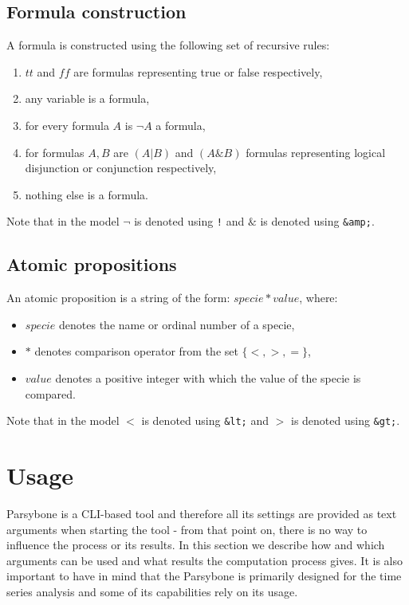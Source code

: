 \documentclass[12pt]{article}
\begin{document}
\subsection{Formula construction}
\label{FormulaConstruction}
A formula is constructed using the following set of recursive rules:
\begin{enumerate}
\item $tt$ and $ff$ are formulas representing true or false respectively,
\item any variable is a formula,
\item for every formula $A$ is $\neg A$ a formula,
\item for formulas $A,B$ are $(A|B)$ and $(A\&B)$ formulas representing logical disjunction or conjunction respectively,
\item nothing else is a formula.
\end{enumerate}
Note that in the model $\neg$ is denoted using \texttt{!} and $\&$ is denoted using \texttt{\&amp;}.

\subsection{Atomic propositions}
\label{AtomicPropositions}
An atomic proposition is a string of the form: $specie*value$, where:
\begin{itemize}
\item $specie$ denotes the name or ordinal number of a specie,
\item $*$ denotes comparison operator from the set $\{<,>,=\}$,
\item $value$ denotes a positive integer with which the value of the specie is compared.
\end{itemize}
Note that in the model $<$ is denoted using \texttt{\&lt;} and $>$ is denoted using \texttt{\&gt;}.

\section{Usage}
Parsybone is a CLI-based tool and therefore all its settings are provided as text arguments when starting the tool - from that point on, there is no way to influence the process or its results. In this section we describe how and which arguments can be used and what results the computation process gives. It is also important to have in mind that the Parsybone is primarily designed for the time series analysis and some of its capabilities rely on its usage.
\end{document}
